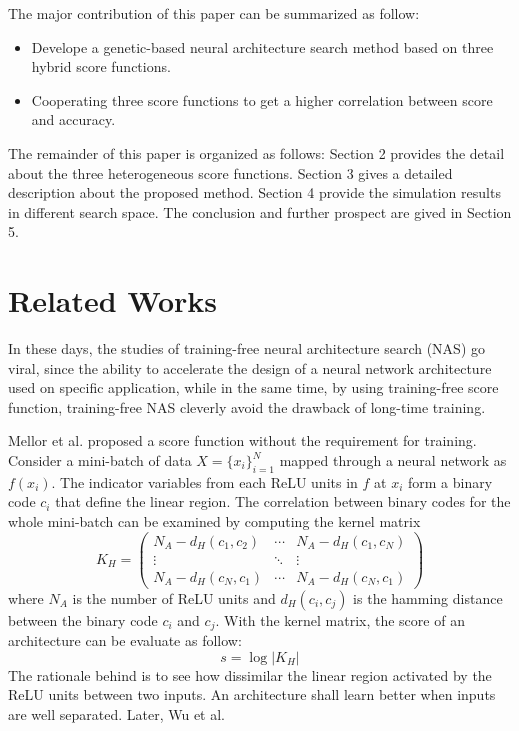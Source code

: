 \documentclass[sigconf]{acmart}
\begin{document}
    The major contribution of this paper can be summarized as follow:
    \begin{itemize}
        \item Develope a genetic-based neural architecture search method based on three hybrid score functions.
        \item Cooperating three score functions to get a higher correlation between score and accuracy.
    \end{itemize}

    The remainder of this paper is organized as follows: Section 2 provides the 
    detail about the three heterogeneous score functions. Section 3 gives a detailed 
    description about the proposed method. Section 4 provide the simulation results 
    in different search space. The conclusion and further prospect are gived in 
    Section 5.

    \section{Related Works}
    In these days, the studies of training-free neural architecture search (NAS) 
    go viral, since the ability to accelerate the design of a neural network 
    architecture used on specific application, while in the same time, by using 
    training-free score function, training-free NAS cleverly avoid the drawback 
    of long-time training. 

    Mellor et al. \cite{https://doi.org/10.48550/arxiv.2006.04647} proposed a 
    score function without the requirement for training. 
    Consider a mini-batch of data $X=\{x_i\}^N_{i=1}$ mapped through a neural 
    network as $f(x_i)$. The indicator variables from each ReLU units in $f$ 
    at $x_i$ form a binary code $c_i$ that define the linear region.
    The correlation between binary codes for the whole mini-batch can be examined 
    by computing the kernel matrix
    \begin{equation}
        K_H=\begin{pmatrix}N_A-d_H(c_1,c_2)&\cdots&N_A-d_H(c_1,c_N)\\\vdots&\ddots&\vdots\\N_A-d_H(c_N,c_1)&\cdots&N_A-d_H(c_N,c_1)\end{pmatrix}
    \end{equation}
    where $N_A$ is the number of ReLU units and $d_H(c_i,c_j)$ is the hamming 
    distance between the binary code $c_i$ and $c_j$.
    With the kernel matrix, the score of an architecture can be evaluate as 
    follow:
    \begin{equation}
        s=\log\lvert K_H\rvert
    \end{equation}
    The rationale behind is to see how dissimilar the linear region activated by 
    the ReLU units between two inputs. An architecture shall learn better 
    when inputs are well separated.
    Later, Wu et al. \cite{10.1145/3491396.3506510} 
    
\end{document}
